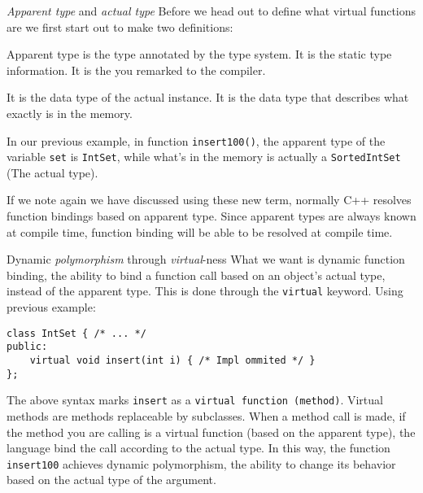 \begin{frame}{\textit{Apparent type} and \textit{actual type}}
Before we head out to define what virtual functions are we first start out to make two definitions:

\begin{description}
	\item[Apparent Type] Apparent type is the type annotated by the type system. It is the static type information. It is the you remarked to the compiler.
	\item[Actual Type] It is the data type of the actual instance. It is the data type that describes what exactly is in the memory.
\end{description}

In our previous example, in function \texttt{insert100()}, the apparent type of the variable \texttt{set} is \texttt{IntSet}, while what's in the memory is actually a \texttt{SortedIntSet} (The actual type).

If we note again we have discussed using these new term, normally C++ resolves function bindings based on apparent type. Since apparent types are always known at compile time, function binding will be able to be resolved at compile time. 
\end{frame}

\begin{frame}[fragile]{Dynamic \textit{polymorphism} through \textit{virtual}-ness}
What we want is dynamic function binding, the ability to bind a function call based on an object's actual type, instead of the apparent type. This is done through the \texttt{virtual} keyword. Using previous example:

\begin{verbatim}
class IntSet { /* ... */
public:  
    virtual void insert(int i) { /* Impl ommited */ }
};
\end{verbatim}

The above syntax marks \texttt{insert} as a \texttt{virtual function (method)}. Virtual methods are methods replaceable by subclasses. When a method call is made, if the method you are calling is a virtual function (based on the apparent type), the language bind the call according to the actual type. In this way, the function \texttt{insert100} achieves dynamic polymorphism, the ability to change its behavior based on the actual type of the argument.
\end{frame}

